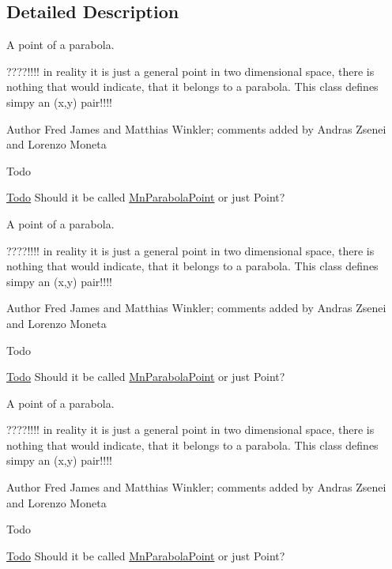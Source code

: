 \subsection{Detailed Description}
A point of a parabola.

????!!!! in reality it is just a general point in two dimensional space, there is nothing that would indicate, that it belongs to a parabola. This class defines simpy an (x,y) pair!!!!

\begin{DoxyAuthor}{Author}
Fred James and Matthias Winkler; comments added by Andras Zsenei and Lorenzo Moneta
\end{DoxyAuthor}
\begin{DoxyRefDesc}{Todo}
\item[\mbox{\hyperlink{todo__todo000011}{Todo}}]Should it be called \mbox{\hyperlink{classROOT_1_1Minuit2_1_1MnParabolaPoint}{Mn\+Parabola\+Point}} or just Point?\end{DoxyRefDesc}


A point of a parabola.

????!!!! in reality it is just a general point in two dimensional space, there is nothing that would indicate, that it belongs to a parabola. This class defines simpy an (x,y) pair!!!!

\begin{DoxyAuthor}{Author}
Fred James and Matthias Winkler; comments added by Andras Zsenei and Lorenzo Moneta
\end{DoxyAuthor}
\begin{DoxyRefDesc}{Todo}
\item[\mbox{\hyperlink{todo__todo000023}{Todo}}]Should it be called \mbox{\hyperlink{classROOT_1_1Minuit2_1_1MnParabolaPoint}{Mn\+Parabola\+Point}} or just Point?\end{DoxyRefDesc}


A point of a parabola.

????!!!! in reality it is just a general point in two dimensional space, there is nothing that would indicate, that it belongs to a parabola. This class defines simpy an (x,y) pair!!!!

\begin{DoxyAuthor}{Author}
Fred James and Matthias Winkler; comments added by Andras Zsenei and Lorenzo Moneta
\end{DoxyAuthor}
\begin{DoxyRefDesc}{Todo}
\item[\mbox{\hyperlink{todo__todo000035}{Todo}}]Should it be called \mbox{\hyperlink{classROOT_1_1Minuit2_1_1MnParabolaPoint}{Mn\+Parabola\+Point}} or just Point?\end{DoxyRefDesc}


